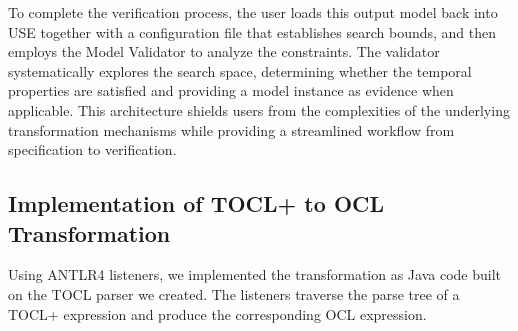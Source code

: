 To complete the verification process, the user loads this output model back into USE 
together with a configuration file that establishes search bounds, and then employs 
the Model Validator to analyze the constraints. The validator systematically explores the search space, determining whether the temporal properties are satisfied and providing a model instance as evidence when applicable. This architecture shields users from the complexities of the underlying transformation mechanisms while providing a streamlined workflow from specification to verification.


\subsection{Implementation of TOCL+ to OCL Transformation}

Using ANTLR4 listeners, we implemented the transformation as Java code built on 
the TOCL parser we created. The listeners traverse the parse tree of a TOCL+
expression and produce the corresponding OCL expression.


